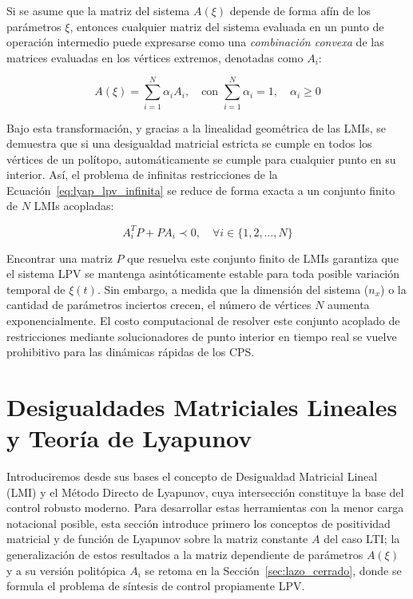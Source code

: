 Si se asume que la matriz del sistema $A(\xi)$ depende de forma afín de los parámetros $\xi$, entonces cualquier matriz del sistema evaluada en un punto de operación intermedio puede expresarse como una \textit{combinación convexa} de las matrices evaluadas en los vértices extremos, denotadas como $A_i$:

\begin{equation}
    A(\xi) = \sum_{i=1}^{N} \alpha_i A_i, \quad \text{con } \sum_{i=1}^{N} \alpha_i = 1, \quad \alpha_i \ge 0
    \label{eq:combinacion_convexa}
\end{equation}

Bajo esta transformación, y gracias a la linealidad geométrica de las LMIs, se demuestra que si una desigualdad matricial estricta se cumple en todos los vértices de un polítopo, automáticamente se cumple para cualquier punto en su interior. Así, el problema de infinitas restricciones de la Ecuación~\eqref{eq:lyap_lpv_infinita} se reduce de forma exacta a un conjunto finito de $N$ LMIs acopladas:

\begin{equation}
    A_i^T P + P A_i \prec 0, \quad \forall i \in \{1, 2, \dots, N\}
    \label{eq:lmi_politopica_finita}
\end{equation}

Encontrar una matriz $P$ que resuelva este conjunto finito de LMIs garantiza que el sistema LPV se mantenga asintóticamente estable para toda posible variación temporal de $\xi(t)$. Sin embargo, a medida que la dimensión del sistema ($n_x$) o la cantidad de parámetros inciertos crecen, el número de vértices $N$ aumenta exponencialmente. El costo computacional de resolver este conjunto acoplado de restricciones mediante solucionadores de punto interior en tiempo real se vuelve prohibitivo para las dinámicas rápidas de los CPS.








\section{Desigualdades Matriciales Lineales y Teoría de Lyapunov}
\label{sec:lyapunov_lmi}

Introduciremos desde sus bases el concepto de Desigualdad Matricial Lineal (LMI) y el Método Directo de Lyapunov, cuya intersección constituye la base del control robusto moderno. Para desarrollar estas herramientas con la menor carga notacional posible, esta sección introduce primero los conceptos de positividad matricial y de función de Lyapunov sobre la matriz constante $A$ del caso LTI; la generalización de estos resultados a la matriz dependiente de parámetros $A(\xi)$ y a su versión politópica $A_i$ se retoma en la Sección~\ref{sec:lazo_cerrado}, donde se formula el problema de síntesis de control propiamente LPV.

